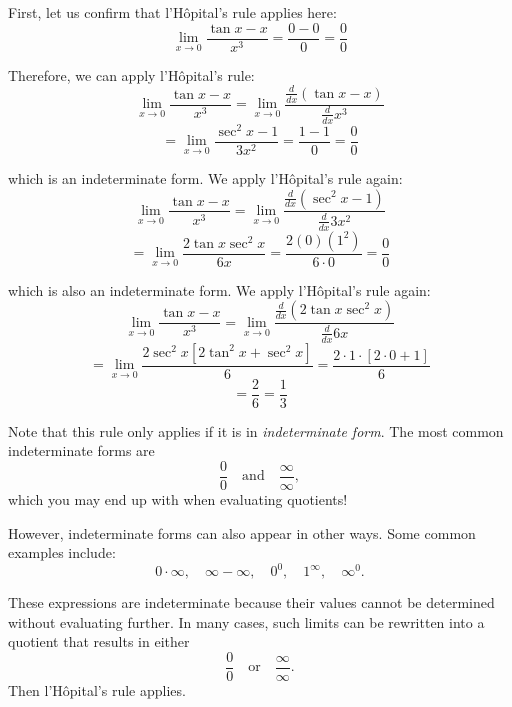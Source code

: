 \begin{Answer}[ref=LH1]
First, let us confirm that l'H\^{o}pital's rule applies here:
$$\lim_{x \to 0} \frac{\tan{x} - x}{x^3} = \frac{0 - 0}{0} = \frac{0}{0}$$

Therefore, we can apply l'H\^{o}pital's rule:
$$\lim_{x \to 0} \frac{\tan{x} - x}{x^3} = \lim_{x \to 0} \frac{\frac{d}{dx}(\tan{x} - x)}{\frac{d}{dx}x^3}$$
$$= \lim_{x \to 0} \frac{\sec^2{x} - 1}{3x^2} = \frac{1 - 1}{0} = \frac{0}{0}$$

which is an indeterminate form. We apply l'H\^{o}pital's rule again:
$$\lim_{x \to 0} \frac{\tan{x} - x}{x^3} = \lim_{x \to 0} \frac{\frac{d}{dx}(\sec^2{x} - 1)}{\frac{d}{dx}3x^2}$$
$$= \lim_{x \to 0} \frac{2\tan{x}\sec^2{x}}{6x} = \frac{2(0)(1^2)}{6 \cdot 0} = \frac{0}{0}$$

which is also an indeterminate form. We apply l'H\^{o}pital's rule again:
$$\lim_{x \to 0} \frac{\tan{x} - x}{x^3} = \lim_{x \to 0} \frac{\frac{d}{dx}(2\tan{x}\sec^2{x})}{\frac{d}{dx}6x}$$
$$= \lim_{x \to 0} \frac{2\sec^2{x}[2\tan^2{x} + \sec^2{x}]}{6} = \frac{2 \cdot 1 \cdot [2 \cdot 0 + 1]}{6}$$
$$= \frac{2}{6} = \frac{1}{3}$$
\end{Answer}

Note that this rule only applies if it is in \emph{indeterminate form}. The most common indeterminate forms are
\begin{equation*}
\frac{0}{0}
\quad \text{and} \quad
\frac{\infty}{\infty},
\end{equation*}
which you may end up with when evaluating quotients!

However, indeterminate forms can also appear in other ways. Some common
examples include:
\begin{equation*}
0 \cdot \infty, \quad
\infty - \infty, \quad
0^0, \quad
1^\infty, \quad
\infty^0.
\end{equation*}

These expressions are indeterminate because their values cannot be
determined without evaluating further. In many cases, such limits can be
rewritten into a quotient that results in either
\begin{equation*}
\frac{0}{0}
\quad \text{or} \quad
\frac{\infty}{\infty}.
\end{equation*} Then l'H\^{o}pital's rule applies.

